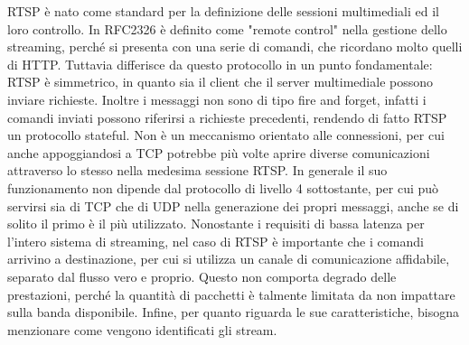 RTSP è nato come standard per la definizione delle sessioni multimediali ed il loro controllo. %
In RFC2326 è definito come "remote control" nella gestione dello streaming, perché si presenta con una serie di comandi, che ricordano molto quelli di HTTP. Tuttavia differisce da questo protocollo in un punto fondamentale: RTSP è simmetrico, in quanto sia il client che il server multimediale possono inviare richieste. Inoltre i messaggi non sono di tipo fire and forget, infatti i comandi inviati possono riferirsi a richieste precedenti, rendendo di fatto RTSP un protocollo stateful\cite{b11rfc2326}. %
Non è un meccanismo orientato alle connessioni, per cui anche appoggiandosi a TCP potrebbe più volte aprire diverse comunicazioni attraverso lo stesso nella medesima sessione RTSP. In generale il suo funzionamento non dipende dal protocollo di livello 4 sottostante, per cui può servirsi sia di TCP che di UDP nella generazione dei propri messaggi, anche se di solito il primo è il più utilizzato. Nonostante i requisiti di bassa latenza per l'intero sistema di streaming, nel caso di RTSP è importante che i comandi arrivino a destinazione, per cui si utilizza un canale di comunicazione affidabile, separato dal flusso vero e proprio. Questo non comporta degrado delle prestazioni, perché la quantità di pacchetti è talmente limitata da non impattare sulla banda disponibile. Infine, per quanto riguarda le sue caratteristiche, bisogna menzionare come vengono identificati gli stream. 

